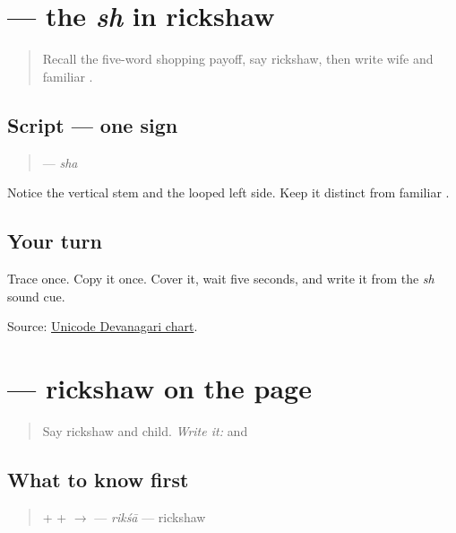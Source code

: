 \section[\texorpdfstring{\mw{श} (śa)}{श (śa)}]{ — the \emph{sh} in rickshaw}

\label{lesson:MW-W17-sha}



\begin{quote}
Recall the five-word shopping payoff, say rickshaw, then write wife and familiar \textbf{}.
\end{quote}

\subsection*{Script — one sign}

\begin{quote}
\textbf{} — \emph{sha}
\end{quote}

Notice the vertical stem and the looped left side. Keep it distinct from familiar \textbf{}.

\subsection*{Your turn}
Trace \textbf{} once. Copy it once. Cover it, wait five seconds, and write it from the \emph{sh} sound cue.

\begin{tcolorbox}[breakable,colback=teal!4,colframe=teal!35!black,title={Before you move on}]
Source: \href{https://www.unicode.org/charts/PDF/U0900.pdf}{Unicode Devanagari chart}.
\end{tcolorbox}
\section[\texorpdfstring{\mw{रिक्शा} (rikśā)}{रिक्शा (rikśā)}]{ — rickshaw on the page}

\label{lesson:MW-C17-riksha}



\begin{quote}
Say rickshaw and child. \emph{Write it:} \textbf{} and \textbf{}
\end{quote}

\subsection*{What to know first}
\begin{quote}
\textbf{} + \textbf{} + \textbf{} $\to$ \textbf{} — \emph{rikśā} — rickshaw
\end{quote}

